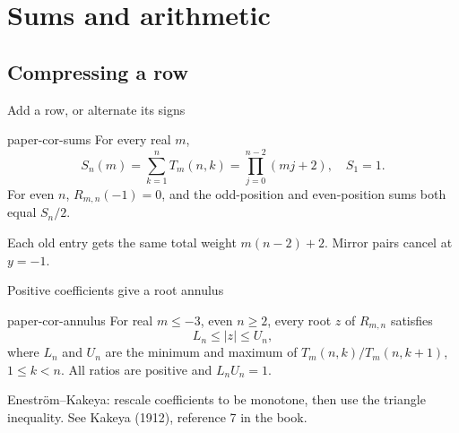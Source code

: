 \documentclass{beamer}
\begin{document}
\section[Sums]{Sums and arithmetic}
\subsection{Compressing a row}
\begin{frame}{Add a row, or alternate its signs}
\begin{bookresult}{paper-cor-sums}
For every real $m$,
\[
S_n(m)=\sum_{k=1}^nT_m(n,k)=\prod_{j=0}^{n-2}(mj+2),\quad S_1=1.
\]
For even $n$, $R_{m,n}(-1)=0$, and the odd-position and even-position sums both equal $S_n/2$.
\end{bookresult}
Each old entry gets the same total weight $m(n-2)+2$. Mirror pairs cancel at $y=-1$.
\end{frame}
\begin{frame}{Positive coefficients give a root annulus}
\begin{bookresult}{paper-cor-annulus}
For real $m\leq-3$, even $n\geq2$, every root $z$ of $R_{m,n}$ satisfies
\[
L_n\leq|z|\leq U_n,
\]
where $L_n$ and $U_n$ are the minimum and maximum of
$T_m(n,k)/T_m(n,k+1)$, $1\leq k<n$.
All ratios are positive and $L_nU_n=1$.
\end{bookresult}
Enestr\"om--Kakeya: rescale coefficients to be monotone, then use the triangle inequality. See Kakeya (1912), reference 7 in the book.
\end{frame}
\end{document}
